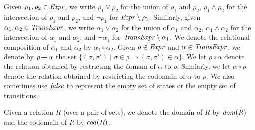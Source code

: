 Given $\rho_1, \rho_2 \in \mathit{Expr}$, we write $\rho_1 \vee \rho_2$ for the union of $\rho_1$ and $\rho_2$, 
$\rho_1 \wedge \rho_2$ for the intersection of $\rho_1$ and $\rho_2$, and $\neg \rho_1$ for $\mathit{Expr} \setminus \rho_1$.
Similarly, given $\alpha_1, \alpha_2 \in \mathit{TransExpr}$, we write $\alpha_1 \vee \alpha_2$ for the union of $\alpha_1$ and $\alpha_2$, 
$\alpha_1 \wedge \alpha_2$ for the intersection of $\alpha_1$ and $\alpha_2$, and $\neg \alpha_1$ for $\mathit{TransExpr} \setminus \alpha_1$.
We denote the relational composition of $\alpha_1$ and $\alpha_2$ by $\alpha_1 \circ \alpha_2$.
Given $\rho \in \mathit{Expr}$ and $\alpha \in \mathit{TransExpr}$, we denote by ${\rho}\!\rightarrow\!{\alpha}$ the
set $\{(\sigma, \sigma') \mid \sigma \in \rho \Rightarrow (\sigma,\sigma') \in \alpha\}$.
We let $\rho \circ \alpha$ denote the relation obtained by restricting the domain of $\alpha$ to $\rho$.
Similarly, we let $\alpha \circ \rho$ denote the relation obtained by restricting the codomain of $\alpha$ to $\rho$.
We also sometimes use $\mathit{false}$ to represent the empty set of states or the empty set of transitions.

Given a relation $R$ (over a pair of sets), we denote the domain of $R$ by $\mathit{dom}(R)$ and the codomain of $R$ by $\mathit{cod}(R)$.


